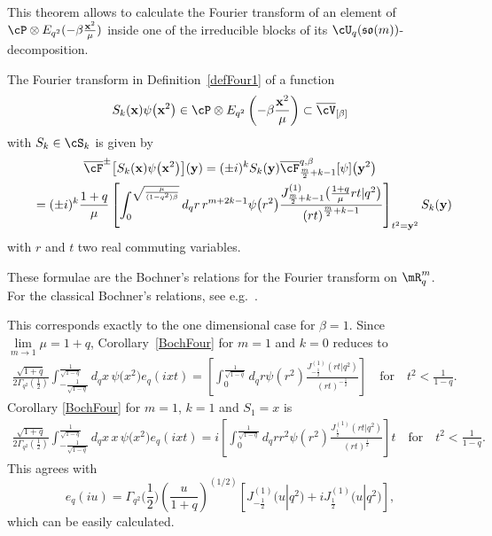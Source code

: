 This theorem allows to calculate the Fourier transform of an element of $\cP\otimes E_{q^2}(-\beta \frac{\bold{x}^2}{\mu})$ inside one of the irreducible blocks of its $\cU_q(\mathfrak{so}(m))$-decomposition.
\begin{corollary}
\label{BochFour}
The Fourier transform in Definition~{\rm \ref{defFour1}} of a function
\[
S_k(\bold{x})\psi\big(\bold{x}^2\big)\in\cP\otimes E_{q^2}\left(-\beta \frac{\bold{x}^2}{\mu}\right)\subset \overline{\cV}_{[\beta]}
\]
 with $S_k\in\cS_k$ is given by
\begin{gather*}
\overline{\cF}^\pm\big[S_k(\bold{x})\psi\big(\bold{x}^2\big)\big](\bold{y}) = (\pm i)^kS_k(\bold{y})\overline{\cF}^{q,\beta}_{\frac{m}{2}+k-1}[\psi]\big(\bold{y}^2\big)\\
\qquad{}  = (\pm i)^k\frac{1+q}{\mu}\left[\int_{0}^{\sqrt{\frac{\mu}{(1-q^2)\beta}}}d_qr \,r^{m+2k-1}\psi\big(r^2\big)\frac{J^{(1)}_{\frac{m}{2}+k-1}\big(\frac{1+q}{\mu}rt|q^2\big)}{\left(rt\right)^{\frac{m}{2}+k-1}}
\right]_{t^2=\bold{y}^2}S_k(\bold{y})
\end{gather*}
with $r$ and $t$ two real commuting variables.
\end{corollary}

These formulae are the Bochner's relations for the Fourier transform on $\mR^m_q$. For the classical Bochner's relations, see e.g.~\cite{MR1151617}.

This corresponds exactly to the one dimensional case for $\beta=1$. Since $\lim\limits_{m\to1}\mu=1+q$, Corollary~\ref{BochFour} for $m=1$ and $k=0$ reduces to
\begin{gather*}
\frac{\sqrt{1+q}}{2\Gamma_{q^2}(\frac{1}{2})}\int_{-\frac{1}{\sqrt{1-q}}}^{\frac{1}{\sqrt{1-q}}}d_qx\,\psi\big(x^2\big)e_q(ixt) = \left[\int_{0}^{\frac{1}{\sqrt{1-q}}}d_qr \psi(r^2)\frac{J^{(1)}_{-\frac{1}{2}}(rt|q^2)}{(rt)^{-\frac{1}{2}}}\right] \quad\mbox{for}\quad t^2<\frac{1}{1-q}.
\end{gather*}
Corollary \ref{BochFour} for $m=1$, $k=1$ and $S_1=x$ is
\begin{gather*}
\frac{\sqrt{1+q}}{2\Gamma_{q^2}(\frac{1}{2})}\int_{-\frac{1}{\sqrt{1-q}}}^{\frac{1}{\sqrt{1-q}}}d_qx\,x\,\psi\big(x^2\big)e_q(ixt) = i\left[ \! \int_{0}^{\frac{1}{\sqrt{1-q}}} \!\!d_qrr^2 \psi(r^2)\frac{J^{(1)}_{\frac{1}{2}} (rt|q^2 )}{(rt)^{\frac{1}{2}}}\right]t
\quad \mbox{for}\quad t^2<\frac{1}{1-q}.
\end{gather*}
This agrees with
\[
e_q(iu)=\Gamma_{q^2}\Big(\frac{1}{2}\Big)\left(\frac{u}{1+q}\right)^{(1/2)}\left[J_{-\frac{1}{2}}^{(1)}\big(u|q^2\big)
+iJ_{\frac{1}{2}}^{(1)}\big(u|q^2\big)\right],
 \]
 which can be easily calculated.

